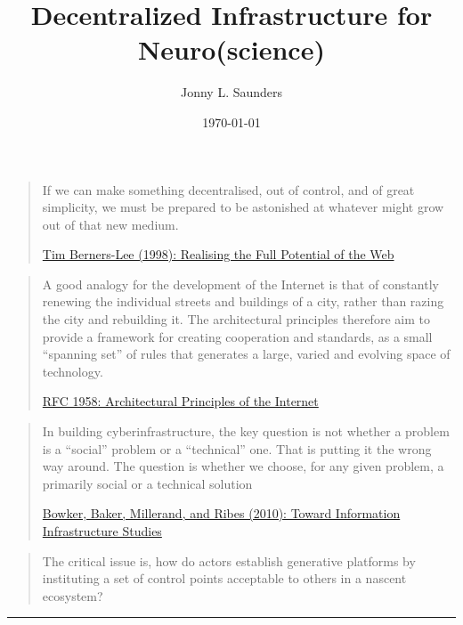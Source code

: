 \documentclass[10pt]{article}
\title{Decentralized Infrastructure for Neuro(science)}
\author{Jonny L. Saunders}
\date{\today}
\begin{document}
\maketitle
\pagebreak
{}
\tableofcontents
\pagebreak
\restoregeometry

\begin{quote}
If we can make something decentralised, out of control, and of great
simplicity, we must be prepared to be astonished at whatever might grow
out of that new medium.

\href{https://www.w3.org/1998/02/Potential.html}{Tim Berners-Lee (1998):
Realising the Full Potential of the Web}
\end{quote}

\begin{quote}
A good analogy for the development of the Internet is that of constantly
renewing the individual streets and buildings of a city, rather than
razing the city and rebuilding it. The architectural principles
therefore aim to provide a framework for creating cooperation and
standards, as a small ``spanning set'' of rules that generates a large,
varied and evolving space of technology.

\href{https://datatracker.ietf.org/doc/html/rfc1958}{RFC 1958:
Architectural Principles of the Internet}
\end{quote}

\begin{quote}
In building cyberinfrastructure, the key question is not whether a
problem is a ``social'' problem or a ``technical'' one. That is putting
it the wrong way around. The question is whether we choose, for any
given problem, a primarily social or a technical solution

\href{https://doi.org/10.1007/978-1-4020-9789-8_5}{Bowker, Baker,
Millerand, and Ribes (2010): Toward Information Infrastructure Studies}
\cite{bowkerInformationInfrastructureStudies2010} 
\end{quote}

\begin{quote}
The critical issue is, how do actors establish generative platforms by
instituting a set of control points acceptable to others in a nascent
ecosystem? \cite{tilsonDigitalInfrastructuresMissing2010} 
\end{quote}

\begin{center}\rule{0.5\linewidth}{0.5pt}\end{center}
\end{document}
